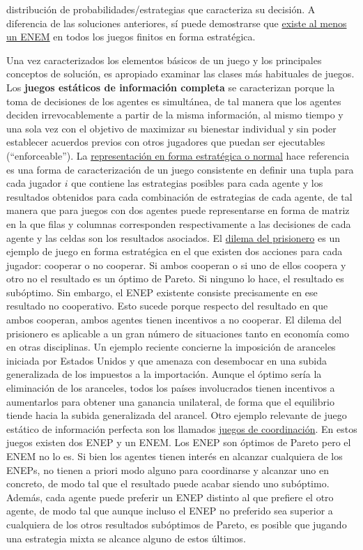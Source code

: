 \documentclass{nuevotema}
\begin{document}
distribución de probabilidades/estrategias que caracteriza su decisión. A diferencia de las soluciones anteriores, sí puede demostrarse que \underline{existe al menos un ENEM} en todos los juegos finitos en forma estratégica.

Una vez caracterizados los elementos básicos de un juego y los principales conceptos de solución, es apropiado examinar las clases más habituales de juegos. Los \textbf{juegos estáticos de información completa} se caracterizan porque la toma de decisiones de los agentes es simultánea, de tal manera que los agentes deciden irrevocablemente a partir de la misma información, al mismo tiempo y una sola vez con el objetivo de maximizar su bienestar individual y sin poder establecer acuerdos previos con otros jugadores que puedan ser ejecutables (``enforceable''). La \underline{representación en forma estratégica o normal} hace referencia es una forma de caracterización de un juego consistente en definir una tupla para cada jugador $i$ que contiene las estrategias posibles para cada agente y los resultados obtenidos para cada combinación de estrategias de cada agente, de tal manera que para juegos con dos agentes puede representarse en forma de matriz en la que filas y columnas corresponden respectivamente a las decisiones de cada agente y las celdas son los resultados asociados. El \underline{dilema del prisionero} es un ejemplo de juego en forma estratégica en el que existen dos acciones para cada jugador: cooperar o no cooperar. Si ambos cooperan o si uno de ellos coopera y otro no el resultado es un óptimo de Pareto. Si ninguno lo hace, el resultado es subóptimo. Sin embargo, el ENEP existente consiste precisamente en ese resultado no cooperativo. Esto sucede porque respecto del resultado en que ambos cooperan, ambos agentes tienen incentivos a no cooperar. El dilema del prisionero es aplicable a un gran número de situaciones tanto en economía como en otras disciplinas. Un ejemplo reciente concierne la imposición de aranceles iniciada por Estados Unidos y que amenaza con desembocar en una subida generalizada de los impuestos a la importación. Aunque el óptimo sería la eliminación de los aranceles, todos los países involucrados tienen incentivos a aumentarlos para obtener una ganancia unilateral, de forma que el equilibrio tiende hacia la subida generalizada del arancel. Otro ejemplo relevante de juego estático de información perfecta son los llamados \underline{juegos de coordinación}. En estos juegos existen dos ENEP y un ENEM. Los ENEP son óptimos de Pareto pero el ENEM no lo es. Si bien los agentes tienen interés en alcanzar cualquiera de los ENEPs, no tienen a priori modo alguno para coordinarse y alcanzar uno en concreto, de modo tal que el resultado puede acabar siendo uno subóptimo. Además, cada agente puede preferir un ENEP distinto al que prefiere el otro agente, de modo tal que aunque incluso el ENEP no preferido sea superior a cualquiera de los otros resultados subóptimos de Pareto, es posible que jugando una estrategia mixta se alcance alguno de estos últimos.
\end{document}
